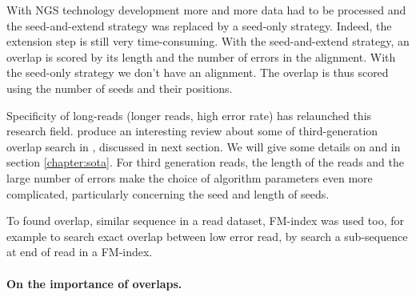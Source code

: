 \documentclass[main.tex]{subfiles}
\begin{document}
With NGS technology development more and more data had to be processed and the seed-and-extend strategy was replaced by a seed-only strategy. Indeed, the extension step is still very time-consuming. With the seed-and-extend strategy, an overlap is scored by its length and the number of errors in the alignment. With the seed-only strategy we don't have an alignment. The overlap is thus scored using the number of seeds and their positions. 


Specificity of long-reads (longer reads, high error rate) has relaunched this research field. \citeauthor{ovl_bench} produce an interesting review about some of third-generation overlap search in \cite{ovl_bench}, discussed in next section. 
We will give some details on \mhap and \minimap in section \ref{chapter:sota}.
For third generation reads, the length of the reads and the large number of errors make the choice of algorithm parameters even more complicated, particularly concerning the seed  and length of seeds.

To found overlap, similar sequence in a read dataset, FM-index was used too, for example  \cite{SGA} to search exact overlap between low error read, by search a sub-sequence at end of read in a FM-index. 


\paragraph{On the importance of overlaps.}
\end{document}
